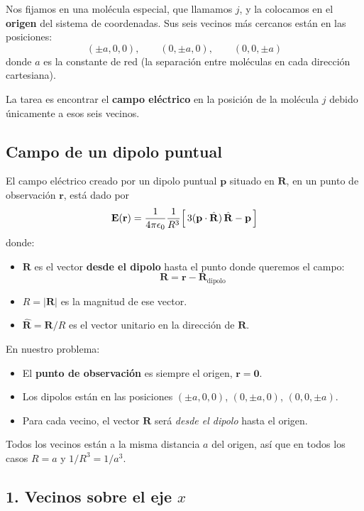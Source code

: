 \documentclass{article}
\begin{document}
Nos fijamos en una molécula especial, que llamamos $j$, y la colocamos en el \textbf{origen} del sistema de coordenadas.  
Sus seis vecinos más cercanos están en las posiciones:
\[
(\pm a,0,0),\qquad (0,\pm a,0),\qquad (0,0,\pm a)
\]
donde $a$ es la constante de red (la separación entre moléculas en cada dirección cartesiana).

La tarea es encontrar el \textbf{campo eléctrico} en la posición de la molécula $j$ debido únicamente a esos seis vecinos.

\subsection*{Campo de un dipolo puntual}

El campo eléctrico creado por un dipolo puntual $\mathbf{p}$ situado en $\mathbf{R}$, en un punto de observación $\mathbf{r}$, está dado por
\begin{equation}
\mathbf{E}(\mathbf{r})
= \frac{1}{4\pi\epsilon_{0}}\frac{1}{R^{3}}
\Bigl[\,3(\mathbf{p}\cdot\hat{\mathbf{R}})\,\hat{\mathbf{R}} - \mathbf{p}\,\Bigr]
\label{eq:E-dipolo}
\end{equation}
donde:
\begin{itemize}
  \item $\mathbf{R}$ es el vector \textbf{desde el dipolo} hasta el punto donde queremos el campo:
    \[
    \mathbf{R} = \mathbf{r} - \mathbf{R}_{\text{dipolo}}
    \]
  \item $R = |\mathbf{R}|$ es la magnitud de ese vector.
  \item $\hat{\mathbf{R}} = \mathbf{R}/R$ es el vector unitario en la dirección de $\mathbf{R}$.
\end{itemize}

En nuestro problema:
\begin{itemize}
  \item El \textbf{punto de observación} es siempre el origen, $\mathbf{r} = \mathbf{0}$.
  \item Los dipolos están en las posiciones $(\pm a,0,0)$, $(0,\pm a,0)$, $(0,0,\pm a)$.
  \item Para cada vecino, el vector $\mathbf{R}$ será \emph{desde el dipolo} hasta el origen.
\end{itemize}

Todos los vecinos están a la misma distancia $a$ del origen, así que en todos los casos $R=a$ y $1/R^{3} = 1/a^{3}$.

\subsection*{1. Vecinos sobre el eje $x$}
\end{document}
